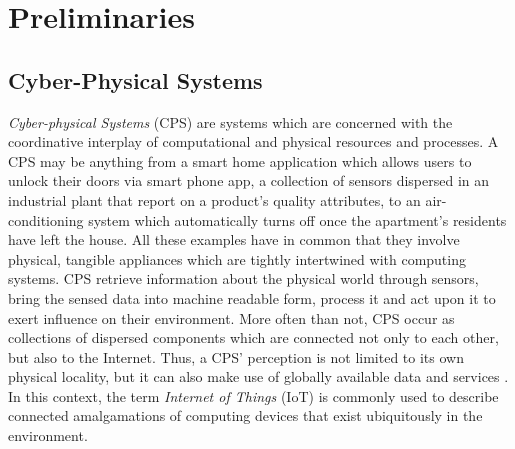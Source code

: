 \chapter{Preliminaries}\label{chapter:preliminaries}

\section{Cyber-Physical Systems}
\emph{Cyber-physical Systems} (CPS) are systems which are concerned with the coordinative interplay of computational and physical resources and processes. A CPS may be anything from a smart home application which allows users to unlock their doors via smart phone app, a collection of sensors dispersed in an industrial plant that report on a product's quality attributes, to an air-conditioning system which automatically turns off once the apartment's residents have left the house.
All these examples have in common that they involve physical, tangible appliances which are tightly intertwined with computing systems.
CPS retrieve information about the physical world through sensors, bring the sensed data into machine readable form, process it and act upon it to exert influence on their environment. More often than not, CPS occur as collections of dispersed components which are connected not only to each other, but also to the Internet. Thus, a CPS' perception is not limited to its own physical locality, but it can also make use of globally available data and services \cite{broy2012cyber}. In this context, the term \emph{Internet of Things} (IoT) is commonly used to describe connected amalgamations of computing devices that exist ubiquitously in the environment.

